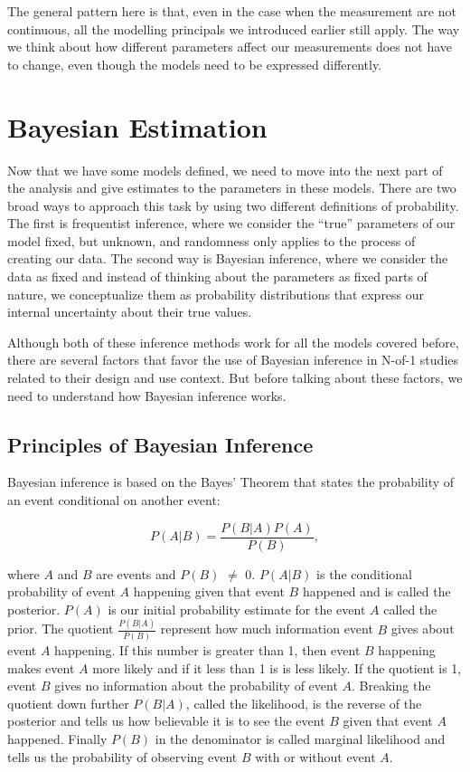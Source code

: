\documentclass[12pt,a4paper,leqno]{report}
\theoremstyle{plain}
\theoremstyle{definition}
\theoremstyle{remark}
\begin{document}
The general pattern here is that, even in the case when the measurement are not
continuous, all the modelling principals we introduced earlier still apply. The way we
think about how different parameters affect our measurements does not have to change,
even though the models need to be expressed differently.

\chapter{Bayesian Estimation}\label{bayes}

Now that we have some models defined, we need to move into the next part of the
analysis and give estimates to the parameters in these models. There
are two broad ways to approach this task by using two different definitions of
probability. The first is frequentist inference, where we consider the ``true''
parameters of our model fixed, but unknown, and randomness only applies to the
process of creating our data. The second way is Bayesian inference, where we
consider the data as fixed and instead of thinking about the parameters as
fixed parts of nature, we conceptualize them as probability distributions that
express our internal uncertainty about their true values.

Although both of these inference methods work for all the models covered before,
there are several factors that favor the use of Bayesian inference in N-of-1
studies related to their design and use context. But before talking about these factors,
we need to understand how Bayesian inference works.

\section{Principles of Bayesian Inference}\label{whybayes}

Bayesian inference is based on the Bayes' Theorem that states the probability of
an event conditional on another event:

\begin{def}\label{}
    \begin{equation}\label{bayesrule}
        P(A|B) = \frac{P(B|A)P(A)}{P(B)},
    \end{equation}
\end{def}where \(A\) and \(B\) are events and \(P(B)\) \(\neq \) 0. \(P(A|B)\) is the conditional probability of event \(A\) happening given that
event \(B\) happened and is called the posterior. \(P(A)\) is our initial
probability estimate for the event \(A\) called the prior. The quotient
\(\frac{P(B|A)}{P(B)}\) represent how much information event \(B\) gives about
event \(A\) happening. If this number is greater than 1, then event \(B\)
happening makes event \(A\) more likely and if it less than 1 is is less likely.
If the quotient is 1, event \(B\) gives no information about the probability of
event \(A\). Breaking the quotient down further \(P(B|A)\), called the likelihood, is the reverse of the posterior and tells us how believable it is to
see the event \(B\) given that event \(A\) happened. Finally \(P(B)\) in the denominator is called marginal likelihood and tells us the probability of
observing event \(B\) with or without event \(A\).
\end{document}
